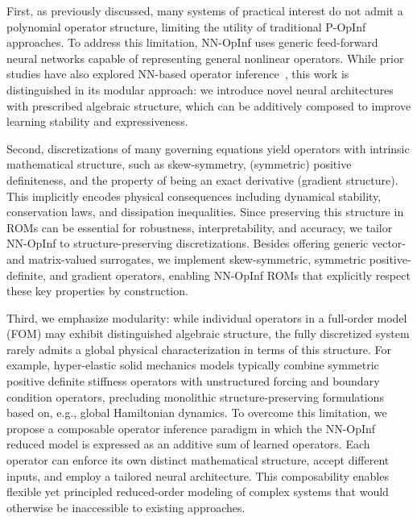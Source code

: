\documentclass[3p,computermodern,11pt]{elsarticle}
\numberwithin{equation}{section}
\begin{document}
First, as previously discussed, many systems of practical interest do not admit a polynomial operator structure, limiting the utility of traditional P-OpInf approaches. To address this limitation, 
NN-OpInf uses generic feed-forward neural networks capable of representing general nonlinear operators. While prior studies have also explored NN-based operator inference~\cite{SaMaAh19,GaWaZh20}, this work is distinguished in its modular approach: we introduce novel 
neural architectures with prescribed algebraic structure, which can be additively composed to improve learning stability and expressiveness. 

Second, discretizations of many governing equations yield operators with intrinsic mathematical structure, such as skew-symmetry, (symmetric) positive definiteness, and the property of being an exact derivative (gradient structure).  This implicitly encodes physical consequences including dynamical stability, conservation laws, and dissipation inequalities.  Since preserving this structure in ROMs can be essential for robustness, interpretability, and accuracy, we tailor NN-OpInf to structure-preserving discretizations.  Besides offering generic vector- and matrix-valued surrogates, we implement skew-symmetric, symmetric positive-definite, and gradient operators, enabling NN-OpInf ROMs that explicitly respect these key properties by construction.

Third, we emphasize modularity: while individual operators in a full-order model (FOM) may exhibit distinguished algebraic structure, the fully discretized system rarely admits a global physical characterization in terms of this structure. For example, hyper-elastic solid mechanics models typically combine symmetric positive definite stiffness operators with unstructured forcing and boundary condition operators, precluding monolithic structure-preserving formulations based on, e.g., global Hamiltonian dynamics. To overcome this limitation, we propose a composable operator inference paradigm in which the NN-OpInf reduced model is expressed as an additive sum of learned operators. Each operator can enforce its own distinct mathematical structure, accept different inputs, and employ a tailored neural architecture. This composability enables flexible yet principled reduced-order modeling of complex systems that would otherwise be inaccessible to existing approaches.
\end{document}
